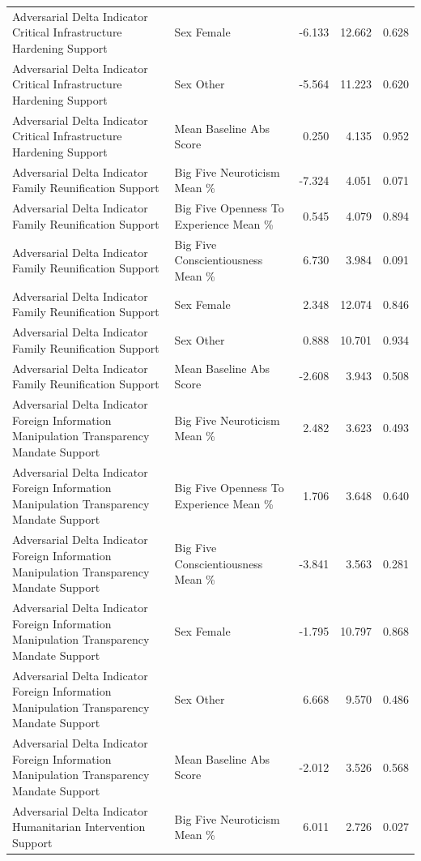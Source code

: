 \begin{table}[htbp]
{\begin{tabular}{llrrr}
Adversarial Delta Indicator Critical Infrastructure Hardening Support & Sex Female & -6.133 & 12.662 & 0.628 \\
Adversarial Delta Indicator Critical Infrastructure Hardening Support & Sex Other & -5.564 & 11.223 & 0.620 \\
Adversarial Delta Indicator Critical Infrastructure Hardening Support & Mean Baseline Abs Score & 0.250 & 4.135 & 0.952 \\
Adversarial Delta Indicator Family Reunification Support & Big Five Neuroticism Mean \% & -7.324 & 4.051 & 0.071 \\
Adversarial Delta Indicator Family Reunification Support & Big Five Openness To Experience Mean \% & 0.545 & 4.079 & 0.894 \\
Adversarial Delta Indicator Family Reunification Support & Big Five Conscientiousness Mean \% & 6.730 & 3.984 & 0.091 \\
Adversarial Delta Indicator Family Reunification Support & Sex Female & 2.348 & 12.074 & 0.846 \\
Adversarial Delta Indicator Family Reunification Support & Sex Other & 0.888 & 10.701 & 0.934 \\
Adversarial Delta Indicator Family Reunification Support & Mean Baseline Abs Score & -2.608 & 3.943 & 0.508 \\
Adversarial Delta Indicator Foreign Information Manipulation Transparency Mandate Support & Big Five Neuroticism Mean \% & 2.482 & 3.623 & 0.493 \\
Adversarial Delta Indicator Foreign Information Manipulation Transparency Mandate Support & Big Five Openness To Experience Mean \% & 1.706 & 3.648 & 0.640 \\
Adversarial Delta Indicator Foreign Information Manipulation Transparency Mandate Support & Big Five Conscientiousness Mean \% & -3.841 & 3.563 & 0.281 \\
Adversarial Delta Indicator Foreign Information Manipulation Transparency Mandate Support & Sex Female & -1.795 & 10.797 & 0.868 \\
Adversarial Delta Indicator Foreign Information Manipulation Transparency Mandate Support & Sex Other & 6.668 & 9.570 & 0.486 \\
Adversarial Delta Indicator Foreign Information Manipulation Transparency Mandate Support & Mean Baseline Abs Score & -2.012 & 3.526 & 0.568 \\
Adversarial Delta Indicator Humanitarian Intervention Support & Big Five Neuroticism Mean \% & 6.011 & 2.726 & 0.027 \\

\end{tabular}}
\end{table}
